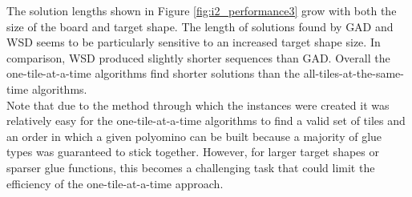 The solution lengths shown in Figure \ref{fig:i2_performance3} grow with both the size of the board and target shape. The length of solutions found by GAD and WSD seems to be particularly sensitive to an increased target shape size. In comparison, WSD produced slightly shorter sequences than GAD. Overall the one-tile-at-a-time algorithms find shorter solutions than the all-tiles-at-the-same-time algorithms. \\
Note that due to the method through which the instances were created it was relatively easy for the one-tile-at-a-time algorithms to find a valid set of tiles and an order in which a given polyomino can be built because a majority of glue types was guaranteed to stick together. However, for larger target shapes or sparser glue functions, this becomes a challenging task that could limit the efficiency of the one-tile-at-a-time approach.


